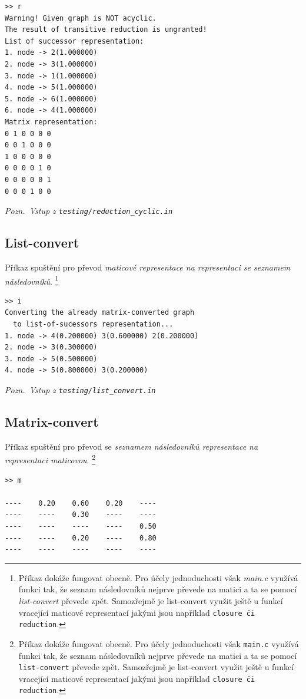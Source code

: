 \documentclass[11pt,a4paper]{article}
\theoremstyle{remark}
\begin{document}
\begin{verbatim}
>> r
Warning! Given graph is NOT acyclic.
The result of transitive reduction is ungranted!
List of successor representation:
1. node -> 2(1.000000)
2. node -> 3(1.000000)
3. node -> 1(1.000000)
4. node -> 5(1.000000)
5. node -> 6(1.000000)
6. node -> 4(1.000000)
Matrix representation:
0 1 0 0 0 0 
0 0 1 0 0 0 
1 0 0 0 0 0 
0 0 0 0 1 0 
0 0 0 0 0 1 
0 0 0 1 0 0 
\end{verbatim}

{\noindent \sl Pozn.~Vstup z \tt testing/reduction\_cyclic.in}

\subsection{List-convert}
Příkaz spuštění pro převod {\sl maticové \rm representace na representaci se
  \sl seznamem následovníků\/}.%
\footnote{Příkaz dokáže fungovat obecně.
Pro účely jednoduchosti však {\sl main.c} využívá funkci tak, že seznam
  následovníků nejprve převede na matici a ta se pomocí {\sl list-convert}
  převede zpět.
Samozřejmě je list-convert využit ještě u funkcí vracející maticové
  representací jakými jsou například {\tt closure\/ {\rm či} reduction\/}.
}
\vfil\eject
\begin{verbatim}
>> i
Converting the already matrix-converted graph
  to list-of-sucessors representation...
1. node -> 4(0.200000) 3(0.600000) 2(0.200000)
2. node -> 3(0.300000)
3. node -> 5(0.500000)
4. node -> 5(0.800000) 3(0.200000)
\end{verbatim}

{\noindent \sl Pozn.~Vstup z \tt testing/list\_convert.in}

\subsection{Matrix-convert}
Příkaz spuštění pro převod se {\sl seznamem následovníků \rm representace na
  representaci \sl maticovou\/}.%
\footnote{Příkaz dokáže fungovat obecně.
Pro účely jednoduchosti však {\tt main.c} využívá funkci tak, že seznam
  následovníků nejprve převede na matici a ta se pomocí {\tt list-convert}
  převede zpět.
Samozřejmě je list-convert využit ještě u funkcí vracející maticové
  representací jakými jsou například {\tt closure či \tt reduction\/}.
}

\begin{verbatim}
>> m

----    0.20    0.60    0.20    ----
----    ----    0.30    ----    ----
----    ----    ----    ----    0.50
----    ----    0.20    ----    0.80
----    ----    ----    ----    ----
\end{verbatim}
\end{document}
